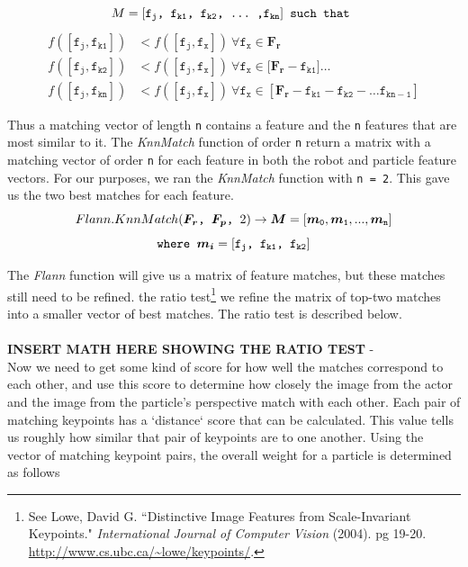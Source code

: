 \documentclass[a4paper,11pt]{article}
\begin{document}
 \[ M = \mathtt{ [f_{j}} \verb., . \mathtt{f_{k1}} \verb., . \mathtt{f_{k2}} \verb-, ... ,- \mathtt{f_{kn}} ] \verb. such that . \]
\begin{align*}
f(\mathtt{[f_{j}, f_{k1}]}) &< f(\mathtt{[f_{j}, f_{x}]})  \  \forall \mathtt{ f_{x}} \in  \boldsymbol{F_r}  \  
\\  f(\mathtt{[f_{j}, f_{k2}]}) &< f(\mathtt{[f_{j}, f_{x}]})  \  \forall \mathtt{ f_{x}} \in  [\boldsymbol{F_r} - \mathtt{f_{k1}]}  \dots
\\ f(\mathtt{[f_{j}, f_{kn}]}) &< f(\mathtt{[f_{j}, f_{x}]})  \  \forall \mathtt{ f_{x}} \in  [\boldsymbol{F_r} - \mathtt{f_{k1} - \mathtt{f_{k2}} -} \dots \mathtt{f_{kn-1}}  ]
\end{align*}

 Thus a matching vector of length \texttt{n} contains a feature and the \texttt{n} features that are most similar to it. The \emph{KnnMatch} function of order \texttt{n} return a matrix with a matching vector of order \texttt{n} for each feature in both the robot and particle feature vectors. For our purposes, we ran the \emph{KnnMatch} function with \texttt{n = 2}. This gave us the two best matches for each feature.
 \[ Flann.KnnMatch(\boldsymbol{F_r} \verb., . \boldsymbol{F_p} \verb., . 2) \to \boldsymbol{M} = \mathtt{ [\boldsymbol{m}_0, \boldsymbol{m}_1, ... , \boldsymbol{m}_n ]} \]
 \[ \verb.where . \boldsymbol{m_i} = \mathtt{ [f_{j}} \verb., . \mathtt{f_{k1}} \verb., . \mathtt{f_{k2}} ]\]

 The \emph{Flann} function will give us a matrix of feature matches, but these matches still need to be refined. the ratio test\footnote{See Lowe, David G. ``Distinctive Image Features from Scale-Invariant Keypoints." {\it International Journal of Computer Vision} (2004). pg 19-20.  \url{http://www.cs.ubc.ca/~lowe/keypoints/}.} we refine the matrix of top-two matches into a smaller vector of best matches. The ratio test is described below.
\\ \\
 \textbf{INSERT MATH HERE SHOWING THE RATIO TEST}
-\\
  Now we need to get some kind of score for how well the matches correspond to each other, and use this score to determine how closely the image from the actor and the image from the particle's perspective match with each other. Each pair of matching keypoints has a `distance` score that can be calculated. This value tells us roughly how similar that pair of keypoints are to one another. Using the vector of matching keypoint pairs, the overall weight for a particle is determined as follows
\end{document}
